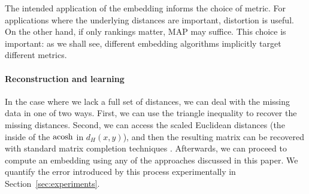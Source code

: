 The intended application of the embedding informs the choice of metric. For applications where the underlying distances are important, distortion is useful. On the other hand, if only rankings matter, MAP may suffice. This choice is important: as we shall see, different embedding algorithms implicitly target different metrics.

\paragraph*{Reconstruction and learning} In the case where we lack a full
set of distances, we can deal with the missing data in one of two
ways. First, we can use the triangle inequality to recover the missing
distances. Second, we can access the scaled Euclidean distances (the
inside of the $\operatorname{acosh}$ in $d_H(x,y)$), and then the resulting matrix can be
recovered with standard matrix completion techniques \cite{TaoMatrix}. Afterwards, we
can proceed to compute an embedding using any of the approaches
discussed in this paper. We quantify the error introduced by this
process experimentally in Section~\ref{sec:experiments}.



